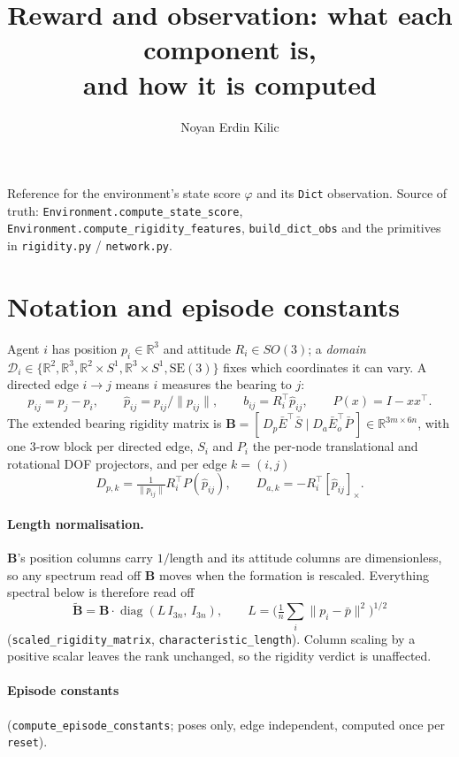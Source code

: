 \documentclass[11pt,a4paper]{article}
\title{\bf Reward and observation: what each component is,\\ and how it is computed}
\author{Noyan Erdin Kilic}
\date{}
\newcommand{\R}{\mathbb{R}}
\newcommand{\SEthree}{\mathrm{SE}(3)}
\newcommand{\B}{\mathbf{B}}
\newcommand{\Bs}{\widetilde{\mathbf{B}}}
\begin{document}
\maketitle

\noindent
Reference for the environment's state score $\varphi$ and its \texttt{Dict} observation.
Source of truth: \texttt{Environment.compute\_state\_score},
\texttt{Environment.compute\_rigidity\_features}, \texttt{build\_dict\_obs} and the
primitives in \texttt{rigidity.py} / \texttt{network.py}.

\section{Notation and episode constants}

Agent $i$ has position $p_i\in\R^3$ and attitude $R_i\in SO(3)$; a \emph{domain}
$\mathcal D_i\in\{\R^2,\R^3,\R^2\!\times\!S^1,\R^3\!\times\!S^1,\SEthree\}$ fixes which
coordinates it can vary. A directed edge $i\to j$ means $i$ measures the bearing to $j$:
\[
p_{ij}=p_j-p_i,\qquad \hat p_{ij}=p_{ij}/\|p_{ij}\|,\qquad b_{ij}=R_i^{\!\top}\hat p_{ij},
\qquad P(x)=I-xx^{\!\top}.
\]
The extended bearing rigidity matrix is $\B=[\,D_p\bar E^{\!\top}\bar S \mid D_a\bar E_o^{\!\top}\bar P\,]\in\R^{3m\times 6n}$,
with one $3$-row block per directed edge, $S_i$ and $P_i$ the per-node translational and
rotational DOF projectors, and per edge $k=(i,j)$
\[
D_{p,k}=\tfrac{1}{\|p_{ij}\|}R_i^{\!\top}P(\hat p_{ij}),
\qquad
D_{a,k}=-R_i^{\!\top}[\hat p_{ij}]_\times .
\]

\paragraph{Length normalisation.} $\B$'s position columns carry $1/\text{length}$ and its
attitude columns are dimensionless, so any spectrum read off $\B$ moves when the formation
is rescaled. Everything spectral below is therefore read off
\[
\Bs=\B\cdot\operatorname{diag}(L\,I_{3n},\,I_{3n}),
\qquad
L=\Big(\tfrac1n\textstyle\sum_i\|p_i-\bar p\|^2\Big)^{1/2}
\]
(\texttt{scaled\_rigidity\_matrix}, \texttt{characteristic\_length}). Column scaling by a
positive scalar leaves the rank unchanged, so the rigidity verdict is unaffected.

\paragraph{Episode constants} (\texttt{compute\_episode\_constants}; poses only, edge
independent, computed once per \texttt{reset}).
\end{document}
